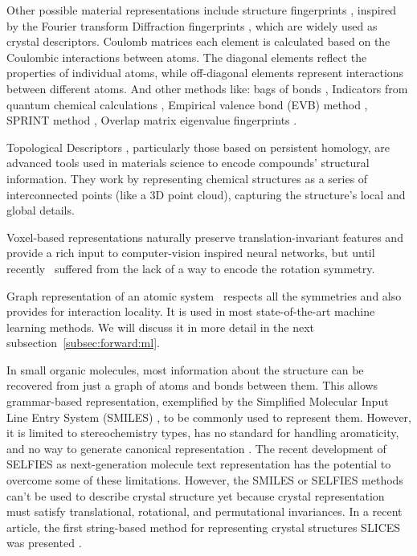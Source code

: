 Other possible material representations include structure fingerprints \cite{warr2011representation}, inspired by the Fourier transform Diffraction fingerprints \cite{ziletti2018insightful}, which are widely used as crystal descriptors. Coulomb matrices \cite{tchagang2019prediction}  each element is calculated based on the Coulombic interactions between atoms. The diagonal elements reflect the properties of individual atoms, while off-diagonal elements represent interactions between different atoms. And other methods like: bags of bonds \cite{hansen2015machine}, Indicators from quantum chemical calculations \cite{Dronskowski1993CrystalOH}, Empirical valence bond (EVB) method \cite{Warshel2004TheEV}, SPRINT method \cite{PhysRevLett.107.085504}, Overlap matrix eigenvalue fingerprints \cite{PhysRevLett.107.085504, zhu_fingerprint_2016}.

Topological Descriptors \cite{li2022encoding}, particularly those based on persistent homology, are advanced tools used in materials science to encode compounds' structural information. They work by representing chemical structures as a series of interconnected points (like a 3D point cloud), capturing the structure's local and global details. 

Voxel-based representations \cite{kajita2017universal} naturally preserve translation-invariant features and provide a rich input to computer-vision inspired neural networks, but until recently~\cite{weiler2019general} suffered from the lack of a way to encode the rotation symmetry.

Graph representation of an atomic system~\cite{xie2018crystal} respects all the symmetries and also provides for interaction locality. It is used in most state-of-the-art machine learning methods. We will discuss it in more detail in the next subsection~\ref{subsec:forward:ml}.

In small organic molecules, most information about the structure can be recovered from just a graph of atoms and bonds between them. This allows grammar-based representation, exemplified by the Simplified Molecular Input Line Entry System (SMILES) \cite{doi:10.1021/ci00062a008}, to be commonly used to represent them. However, it is limited to stereochemistry types, has no standard for handling aromaticity, and no way to generate canonical representation \cite{oboyle_towards_2012}. The recent development of SELFIES \cite{krenn2022selfies} as next-generation molecule text representation has the potential to overcome some of these limitations. However, the SMILES or SELFIES methods can't be used to describe crystal structure yet because crystal representation must satisfy translational, rotational, and permutational invariances. In a recent article, the first string-based method for representing crystal structures SLICES was presented \cite{xiao2023invertible}. 

